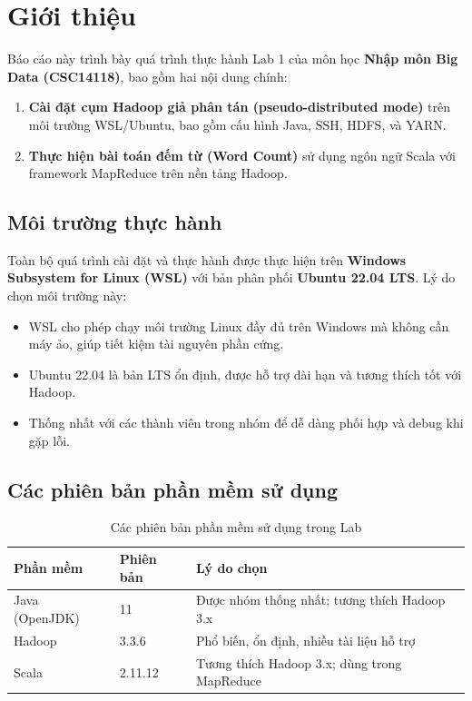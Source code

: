 \section{Giới thiệu}
\label{sec:introduction}

Báo cáo này trình bày quá trình thực hành Lab 1 của môn học \textbf{Nhập môn Big Data (CSC14118)}, bao gồm hai nội dung chính:

\begin{enumerate}
    \item \textbf{Cài đặt cụm Hadoop giả phân tán (pseudo-distributed mode)} trên môi trường WSL/Ubuntu, bao gồm cấu hình Java, SSH, HDFS, và YARN.
    \item \textbf{Thực hiện bài toán đếm từ (Word Count)} sử dụng ngôn ngữ Scala với framework MapReduce trên nền tảng Hadoop.
\end{enumerate}

\subsection{Môi trường thực hành}

Toàn bộ quá trình cài đặt và thực hành được thực hiện trên \textbf{Windows Subsystem for Linux (WSL)} với bản phân phối \textbf{Ubuntu 22.04 LTS}. Lý do chọn môi trường này:

\begin{itemize}
    \item WSL cho phép chạy môi trường Linux đầy đủ trên Windows mà không cần máy ảo, giúp tiết kiệm tài nguyên phần cứng.
    \item Ubuntu 22.04 là bản LTS ổn định, được hỗ trợ dài hạn và tương thích tốt với Hadoop.
    \item Thống nhất với các thành viên trong nhóm để dễ dàng phối hợp và debug khi gặp lỗi.
\end{itemize}

\subsection{Các phiên bản phần mềm sử dụng}

\begin{table}[H]
    \centering
    \begin{tabular}{|l|l|l|}
        \hline
        \textbf{Phần mềm} & \textbf{Phiên bản} & \textbf{Lý do chọn} \\
        \hline
        Java (OpenJDK) & 11 & Được nhóm thống nhất; tương thích Hadoop 3.x \\
        \hline
        Hadoop & 3.3.6 & Phổ biến, ổn định, nhiều tài liệu hỗ trợ \\
        \hline
        Scala & 2.11.12 & Tương thích Hadoop 3.x; dùng trong MapReduce \\
        \hline
    \end{tabular}
    \caption{Các phiên bản phần mềm sử dụng trong Lab}
    \label{tab:software_versions}
\end{table}

